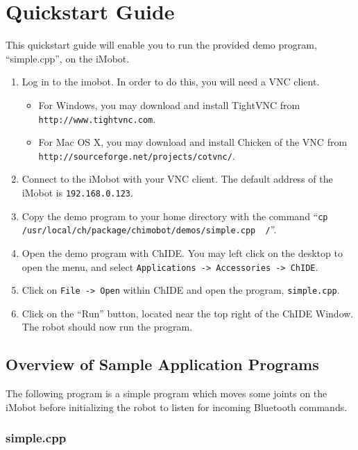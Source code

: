 \documentclass[11pt]{report}
\begin{document}
\chapter{Quickstart Guide}
This quickstart guide will enable you to run the provided demo program,
``simple.cpp'', on the iMobot.
\begin{enumerate}
\item Log in to the imobot. In order to do this, you will need a VNC client. 
  \begin{itemize}
  \item For Windows, you may download and install TightVNC from \texttt{http://www.tightvnc.com}.
  \item For Mac OS X, you may download and install Chicken of the VNC from \texttt{http://sourceforge.net/projects/cotvnc/}.
  \end{itemize}
\item Connect to the iMobot with your VNC client. The default address of the iMobot is \texttt{192.168.0.123}.
\item Copy the demo program to your home directory with the command ``\texttt{cp /usr/local/ch/package/chimobot/demos/simple.cpp ~/}''.
\item Open the demo program with ChIDE. You may left click on the desktop to open the menu, and select \texttt{Applications -> Accessories -> ChIDE}.
\item Click on \texttt{File -> Open} within ChIDE and open the program, \texttt{simple.cpp}. 
\item Click on the ``Run'' button, located near the top right of the ChIDE Window. The robot should now run the program.
\end{enumerate}

\section{Overview of Sample Application Programs}
The following program is a simple program which moves some joints on the iMobot
before initializing the robot to listen for incoming Bluetooth commands.
\subsection{simple.cpp \label{subsec:simple.cpp}}
\end{document}
